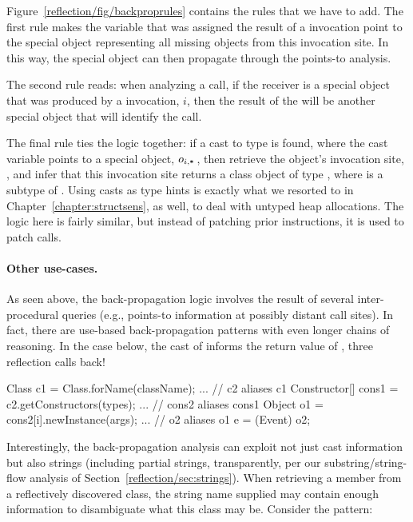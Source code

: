 Figure~\ref{reflection/fig/backproprules} contains the rules that we
have to add. The first rule makes the variable that was assigned the
result of a  invocation point to the special object
representing all missing objects from this invocation site. In this
way, the special object can then propagate through the points-to
analysis.

The second rule reads: when analyzing a  call, if
the receiver is a special object that was produced by a 
invocation, \(i\), then the result of the  will be
another special object
that will identify the  call.

The final rule ties the logic together: if a cast to type  is
found, where the cast variable points to a special object,
\(o_{i,\texttt{*}}\,\), then retrieve the object's 
invocation site, , and infer that this invocation site returns
a class object of type , where  is a subtype of
. Using casts as type hints is exactly what we resorted to in
Chapter~\ref{chapter:structsens}, as well, to deal with untyped heap
allocations. The logic here is fairly similar, but instead of patching
prior  instructions, it is used to patch 
calls.


\paragraph{Other use-cases.}

As seen above, the back-propagation logic involves the result of
several inter-procedural queries (e.g., points-to information at
possibly distant call sites). In fact, there are use-based
back-propagation patterns with even longer chains of reasoning. In the
case below, the cast of  informs the return value of
, three reflection calls back!

\begin{javacodelinum}
Class c1 = Class.forName(className);
...      // c2 aliases c1
Constructor[] cons1 = c2.getConstructors(types); 
...      // cons2 aliases cons1
Object o1 = cons2[i].newInstance(args); 
...      // o2 aliases o1
e = (Event) o2;    
\end{javacodelinum}

Interestingly, the back-propagation analysis can exploit not just cast
information but also strings (including partial strings, transparently,
per our substring/string-flow analysis of Section~\ref{reflection/sec:strings}).
When retrieving a member from a reflectively discovered class, the
string name supplied may contain enough information to disambiguate
what this class may be. Consider the pattern:

